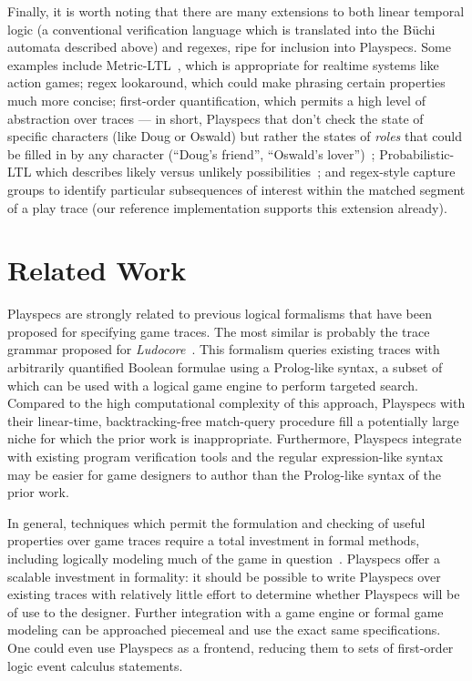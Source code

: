 \documentclass[letterpaper]{article}
\begin{document}
Finally, it is worth noting that there are many extensions to both linear temporal logic (a conventional verification language which is translated into the B\"{u}chi automata described above) and regexes, ripe for inclusion into Playspecs. Some examples include Metric-LTL~\cite{koymans1990specifying}, which is appropriate for realtime systems like action games; regex lookaround, which could make phrasing certain properties much more concise; first-order quantification, which permits a high level of abstraction over traces --- in short, Playspecs that don't check the state of specific characters (like Doug or Oswald) but rather the states of \emph{roles} that could be filled in by any character (``Doug's friend'', ``Oswald's lover'')~\cite{kroger2008first}; Probabilistic-LTL which describes likely versus unlikely possibilities~\cite{baier1998algorithmic}; and regex-style capture groups to identify particular subsequences of interest within the matched segment of a play trace (our reference implementation supports this extension already).

\section{Related Work}
\label{sec:relatedwork}

\noindent Playspecs are strongly related to previous logical formalisms that have been proposed for specifying game traces. The most similar is probably the trace grammar proposed for \emph{Ludocore}~\cite{smith2011towards}. This formalism queries existing traces with arbitrarily quantified Boolean formulae using a Prolog-like syntax, a subset of which can be used with a logical game engine to perform targeted search. Compared to the high computational complexity of this approach, Playspecs with their linear-time, backtracking-free match-query procedure fill a potentially large niche for which the prior work is inappropriate. Furthermore, Playspecs integrate with existing program verification tools and the regular expression-like syntax may be easier for game designers to author than the Prolog-like syntax of the prior work.

In general, techniques which permit the formulation and checking of useful properties over game traces require a total investment in formal methods, including logically modeling much of the game in question~\cite{smith2009computational,shaker2013evolving,butler2013mixed}. Playspecs offer a scalable investment in formality: it should be possible to write Playspecs over existing traces with relatively little effort to determine whether Playspecs will be of use to the designer. Further integration with a game engine or formal game modeling can be approached piecemeal and use the exact same specifications. One could even use Playspecs as a frontend, reducing them to sets of first-order logic event calculus statements.
\end{document}
